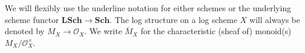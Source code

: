 \documentclass[a4paper,11pt]{amsart} %
\numberwithin{equation}{subsection}
\newcommand{\ca}[1]{{\mathcal{#1}}}
\newcommand{\bd}[1]{{\mathbf{#1}}}
\newcommand{\cat}[1]{\bd{#1}}
\def\NN{\mathbb N}
\def\o#1{\overline{#1}}
\theoremstyle{definition}
\newtheorem{definition}{Definition}[section]
\theoremstyle{plain}%
\theoremstyle{remark}
\begin{document}
We will flexibly use the underline notation for either schemes or the underlying scheme functor $\cat{LSch} \to \cat{Sch}$. The log structure on a log scheme $X$ will always be denoted by $M_X \to \ca O_X$. We write $\o M_X$ for the characteristic (sheaf of) monoid(s) $M_X/\ca O_X^\times$.

\end{document}
